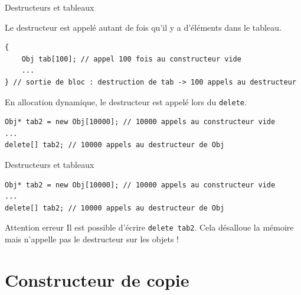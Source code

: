 \begin{frame}[fragile=singleslide]{Destructeurs et tableaux}

    Le destructeur est appelé autant de fois qu'il y a d'éléments dans le tableau.
    
        \begin{verbatim}
{
    Obj tab[100]; // appel 100 fois au constructeur vide
    ...
} // sortie de bloc : destruction de tab -> 100 appels au destructeur
        \end{verbatim}
    
    En allocation dynamique, le destructeur est appelé lors du \texttt{delete}.
    
        \begin{verbatim}
Obj* tab2 = new Obj[10000]; // 10000 appels au constructeur vide
...
delete[] tab2; // 10000 appels au destructeur de Obj
        \end{verbatim}
    
\end{frame}

\begin{frame}[fragile=singleslide]{Destructeurs et tableaux}
    
        \begin{verbatim}
Obj* tab2 = new Obj[10000]; // 10000 appels au constructeur vide
...
delete[] tab2; // 10000 appels au destructeur de Obj
        \end{verbatim}
    
\begin{alertblock}{Attention erreur}
    Il est possible d'écrire \texttt{delete tab2}.
    Cela désalloue la mémoire mais n'appelle pas le destructeur sur les objets !
\end{alertblock}
\end{frame}

\section{Constructeur de copie}

